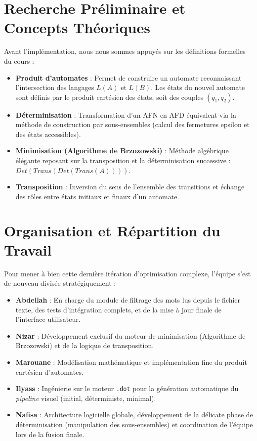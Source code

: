 \documentclass[12pt,a4paper]{article}
\begin{document}
\section{Recherche Préliminaire et Concepts Théoriques}
Avant l'implémentation, nous nous sommes appuyés sur les définitions formelles du cours :
\begin{itemize}
    \item \textbf{Produit d'automates} : Permet de construire un automate reconnaissant l'intersection des langages $L(A)$ et $L(B)$. Les états du nouvel automate sont définis par le produit cartésien des états, soit des couples $(q_1, q_2)$.
    \item \textbf{Déterminisation} : Transformation d'un AFN en AFD équivalent via la méthode de construction par sous-ensembles (calcul des fermetures epsilon et des états accessibles).
    \item \textbf{Minimisation (Algorithme de Brzozowski)} : Méthode algébrique élégante reposant sur la transposition et la déterminisation successive : $Det(Trans(Det(Trans(A))))$.
    \item \textbf{Transposition} : Inversion du sens de l'ensemble des transitions et échange des rôles entre états initiaux et finaux d'un automate.
\end{itemize}

\section{Organisation et Répartition du Travail}
Pour mener à bien cette dernière itération d'optimisation complexe, l'équipe s'est de nouveau divisée stratégiquement :
\begin{itemize}
    \item \textbf{Abdellah} : En charge du module de filtrage des mots lus depuis le fichier texte, des tests d'intégration complets, et de la mise à jour finale de l'interface utilisateur.
    \item \textbf{Nizar} : Développement exclusif du moteur de minimisation (Algorithme de Brzozowski) et de la logique de transposition.
    \item \textbf{Marouane} : Modélisation mathématique et implémentation fine du produit cartésien d'automates.
    \item \textbf{Ilyass} : Ingénierie sur le moteur \texttt{.dot} pour la génération automatique du \textit{pipeline} visuel (initial, déterministe, minimal).
    \item \textbf{Nafisa} : Architecture logicielle globale, développement de la délicate phase de déterminisation (manipulation des sous-ensembles) et coordination de l'équipe lors de la fusion finale.
\end{itemize}
\end{document}
